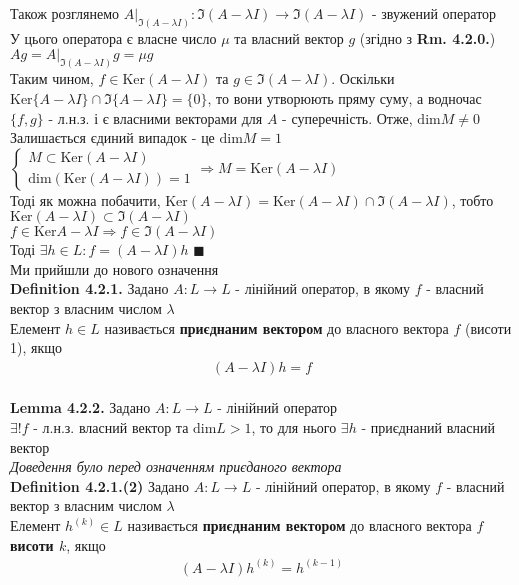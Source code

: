 \documentclass[a4paper, 14pt]{extarticle}
\def\defin#1{\textbf{Definition {#1}}}
\def\lm#1{\textbf{Lemma {#1}}}
\def\bigline{\vspace{5mm}\\}
\def\qed{$\blacksquare$}
\def\dim#1{\textrm{dim} {#1}}
\def\ker#1{\textrm{Ker} {#1}}
\begin{document}
Також розглянемо $A |_{\Im(A-\lambda I)}: \Im(A-\lambda I) \to \Im(A-\lambda I)$ - звужений оператор\\
У цього оператора є власне число $\mu$ та власний вектор $g$ (згідно з \textbf{Rm. 4.2.0.}) \\
$Ag = A |_{\Im(A-\lambda I)} g = \mu g$\\
Таким чином, $f \in \textrm{Ker}(A-\lambda I)$ та $g \in \Im(A-\lambda I)$. Оскільки $\ker \{ A-\lambda I \} \cap \Im \{ A - \lambda I \} = \{ 0 \}$, то вони утворюють пряму суму, а водночас $\{f,g\}$ - л.н.з. і є власними векторами для $A$ - суперечність. Отже, $\dim M \neq 0$
\bigline
Залишається єдиний випадок - це $\dim M = 1$\\
$\begin{cases}
M \subset \textrm{Ker}(A-\lambda I)\\
\dim{(\textrm{Ker}(A-\lambda I))} = 1
\end{cases}
\Rightarrow M = \textrm{Ker}(A-\lambda I)$
\bigline
Тоді як можна побачити, $\textrm{Ker}(A-\lambda I) = \textrm{Ker}(A-\lambda I) \cap \Im (A - \lambda I)$, тобто $\textrm{Ker}(A-\lambda I) \subset \Im(A-\lambda I)$\\
$f \in \textrm{Ker}{A- \lambda I} \Rightarrow f \in \Im(A - \lambda I)$\\
Тоді $\exists h \in L: f = (A-\lambda I)h$ \qed \\
Ми прийшли до нового означення
\bigline
\defin{4.2.1.} Задано $A: L \to L$ - лінійний оператор, в якому $f$ - власний вектор з власним числом $\lambda$\\
Елемент $h \in L$ називається \textbf{приєднаним вектором} до власного вектора $f$ (висоти 1), якщо
\begin{align*}
(A-\lambda I)h = f
\end{align*}
\\
\lm{4.2.2.} Задано $A: L \to L$ - лінійний оператор\\
$\exists! f$ - л.н.з. власний вектор та $\dim L > 1$, то для нього $\exists h$ - приєднаний власний вектор\\
\textit{Доведення було перед означенням приєданого вектора}
\bigline
\defin{4.2.1.(2)} Задано $A: L \to L$ - лінійний оператор, в якому $f$ - власний вектор з власним числом $\lambda$\\
Елемент $h^{(k)} \in L$ називається \textbf{приєднаним вектором} до власного вектора $f$ \textbf{висоти $k$}, якщо
\begin{align*}
(A-\lambda I)h^{(k)} = h^{(k-1)}
\end{align*}
\end{document}
